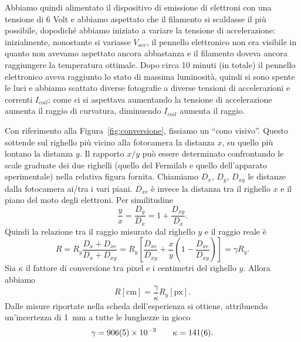 \documentclass[10pt, a4paper, italian]{article}
\begin{document}
Abbiamo quindi alimentato il dispositivo di emissione di elettroni con una tensione di 6 Volt e abbiamo aspettato che il filamento si scaldasse il più possibile, dopodiché abbiamo iniziato a variare la tensione di accelerazione: inizialmente, nonostante si variasse $V_{acc}$, il pennello elettronico non era visibile in quanto non avevamo aspettato ancora abbastanza e il filamento doveva ancora raggiungere la temperatura ottimale. Dopo circa 10 minuti (in totale) il pennello elettronico aveva raggiunto lo stato di massima luminosità, quindi si sono spente le luci e abbiamo scattato diverse fotografie a diverse tensioni di accelerazioni e correnti $I_{coil}$; come ci si aspettava aumentando la tensione di accelerazione aumenta il raggio di curvatura, diminuendo $I_{coil}$ aumenta il raggio.

Con riferimento alla Figura~\ref{fig:conversione}, fissiamo un ``cono visivo''. Questo sottende sul righello più vicino alla fotocamera la distanza $ x $, su quello più lontano la distanza $ y $. Il rapporto $x/y$ può essere determinato confrontando le scale graduate dei due righelli (quello del Fermilab e quello dell'apparato sperimentale) nella relativa figura fornita. Chiamiamo $ D_{x} $, $ D_{y} $, $ D_{xy} $ le distanze dalla fotocamera ai/tra i vari piani. $ D_{xe} $ è invece la distanza tra il righello $ x $ e il piano del moto degli elettroni.
Per similitudine
\[ \frac{y}{x} = \frac{D_{y}}{D_{x}} = 1 + \frac{D_{xy}}{D_{x}}. \]
Quindi la relazione tra il raggio misurato dal righello $ y $ e il raggio reale è
\[
    R = R_{y} \frac{D_{x} + D_{xe}}{D_{x} + D_{xy}} =
    R_{y} \left[ \frac{D_{xe}}{D_{xy}} + \frac{x}{y} \left(1 - \frac{D_{xe}}{D_{xy}}\right) \right]
    = \gamma R_{y}.
\]
Sia $ \kappa $ il fattore di conversione tra pixel e i centimetri del righello $ y $. Allora abbiamo
\[ R[\si{\centi\meter}] = \frac{\gamma}{\kappa} R_{y}[\mathrm{px}]. \]
Dalle misure riportate nella scheda dell'esperienza si ottiene, attribuendo un'incertezza di \SI{1}{\milli\meter} a tutte le lunghezze in gioco
\[ \gamma = \num{ 906\pm 5 e-3 } \qquad \kappa = \num{ 141 \pm 6 }. \]

\end{document}
